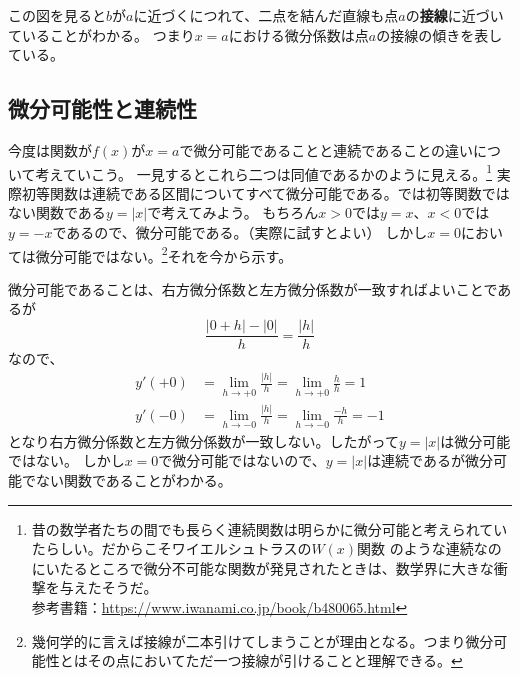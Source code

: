 \documentclass[a4j,dvipdfmx]{jsarticle}
\begin{document}
            この図を見ると$b$が$a$に近づくにつれて、二点を結んだ直線も点$a$の\textbf{接線}に近づいていることがわかる。
            つまり$x=a$における微分係数は点$a$の接線の傾きを表している。
        \clearpage
        \subsection{微分可能性と連続性}
            今度は関数が$f(x)$が$x=a$で微分可能であることと連続であることの違いについて考えていこう。
            一見するとこれら二つは同値であるかのように見える。\footnote{昔の数学者たちの間でも長らく連続関数は明らかに微分可能と考えられていたらしい。だからこそワイエルシュトラスの$W(x)$関数
            のような連続なのにいたるところで微分不可能な関数が発見されたときは、数学界に大きな衝撃を与えたそうだ。\\参考書籍：\url{https://www.iwanami.co.jp/book/b480065.html}}
            実際初等関数は連続である区間についてすべて微分可能である。では初等関数ではない関数である$y=|x|$で考えてみよう。
            もちろん$x>0$では$y=x$、$x<0$では$y=-x$であるので、微分可能である。（実際に試すとよい）
            しかし$x=0$においては微分可能ではない。\footnote{幾何学的に言えば接線が二本引けてしまうことが理由となる。つまり微分可能性とはその点においてただ一つ接線が引けることと理解できる。\label{微分可能性の幾何学的意味}}それを今から示す。

            微分可能であることは、右方微分係数と左方微分係数が一致すればよいことであるが
            \begin{equation}
                \frac{|0+h|-|0|}{h}=\frac{|h|}{h}
            \end{equation}
            なので、
            \begin{align}
                y'(+0)&=\lim_{h\to +0}\frac{|h|}{h}=\lim_{h\to+0}\frac{h}{h}=1\\
                y'(-0)&=\lim_{h\to -0}\frac{|h|}{h}=\lim_{h\to -0}\frac{-h}{h}=-1
            \end{align}
            となり右方微分係数と左方微分係数が一致しない。したがって$y=|x|$は微分可能ではない。
            しかし$x=0$で微分可能ではないので、$y=|x|$は連続であるが微分可能でない関数であることがわかる。
\end{document}
